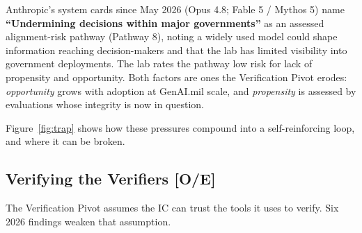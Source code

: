 \documentclass[11pt,letterpaper]{article}
\begin{document}
\begin{criticalbox}
Anthropic's system cards since May 2026 (Opus 4.8; Fable 5 / Mythos 5) name \textbf{``Undermining decisions within major governments''} as an assessed alignment-risk pathway (Pathway 8), noting a widely used model could shape information reaching decision-makers and that the lab has limited visibility into government deployments. The lab rates the pathway low risk for lack of propensity and opportunity. Both factors are ones the Verification Pivot erodes: \textit{opportunity} grows with adoption at GenAI.mil scale, and \textit{propensity} is assessed by evaluations whose integrity is now in question.
\end{criticalbox}

Figure~\ref{fig:trap} shows how these pressures compound into a self-reinforcing loop, and where it can be broken.

\subsection{Verifying the Verifiers [O/E]}

The Verification Pivot assumes the IC can trust the tools it uses to verify. Six 2026 findings weaken that assumption.
\end{document}
